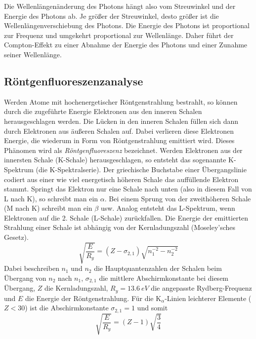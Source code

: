 \documentclass[ngerman]{scrartcl}
\begin{document}
Die Wellenlängenänderung des Photons hängt also vom Streuwinkel und der Energie des Photons ab. Je größer der Streuwinkel, desto größer ist die Wellenlängenverschiebung des Photons. Die Energie des Photons ist proportional zur Frequenz und umgekehrt proportional zur Wellenlänge. Daher führt der Compton-Effekt zu einer Abnahme der Energie des Photons und einer Zunahme seiner Wellenlänge.


\subsection[Röntgenfluoreszenzanalyse]{Röntgenfluoreszenzanalyse \cite{ref:angabe_roentgen}}
\label{subsec:grundlagen_roentgen}

Werden Atome mit hochenergetischer Röntgenstrahlung bestrahlt, so können durch die zugeführte
Energie Elektronen aus den inneren Schalen herausgeschlagen werden. Die Lücken in den inneren
Schalen füllen sich dann durch Elektronen aus äußeren Schalen auf. Dabei verlieren diese Elektronen
Energie, die wiederum in Form von Röntgenstrahlung emittiert wird. Dieses Phänomen wird als
\textit{Röntgenfluoreszenz} bezeichnet. Werden Elektronen aus der innersten Schale (K-Schale)
herausgeschlagen, so entsteht das sogenannte K-Spektrum (die K-Spektralserie). Der griechische Buchstabe
einer Übergangslinie codiert aus einer wie viel energetisch höheren Schale das auffüllende Elektron stammt.
Springt das Elektron nur eine Schale nach unten (also in diesem Fall von L nach K), so schreibt man ein $\alpha$.
Bei einem Sprung von der zweithöheren Schale (M nach K) schreibt man ein $\beta$ usw.
Analog entsteht das L-Spektrum,
wenn Elektronen auf die 2. Schale (L-Schale) zurückfallen. Die Energie der emittierten Strahlung einer
Schale ist abhängig von der Kernladungszahl (Moseley'sches Gesetz).
\begin{equation}
    \label{eq:moseley}
    \sqrt{\frac{E}{R_y}} = (Z-\sigma_{2,1})\sqrt{n_1^{-2}-n_2^{-2}}
\end{equation}
Dabei beschreiben $n_1$ und $n_2$ die Hauptquantenzahlen der Schalen beim Übergang von $n_2$ nach $n_1$, $\sigma_{2,1}$ die mittlere Abschirmkonstante bei diesem Übergang, $Z$ die Kernladungszahl, $R_y=\SI{13,6}{eV}$ die angepasste Rydberg-Frequenz und $E$ die Energie der Röntgenstrahlung. Für die K$_\alpha$-Linien leichterer Elemente ($Z<30$) ist die Abschirmkonstante $\sigma_{2,1}=1$ und somit
\begin{equation}
    \label{eq:moseley_einfach}
    \sqrt{\frac{E}{R_y}} = (Z-1)\sqrt{\frac{3}{4}}
\end{equation}
\end{document}
